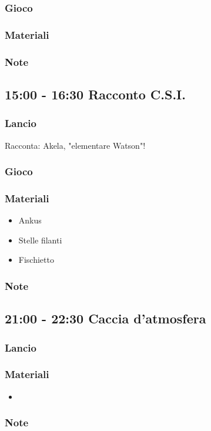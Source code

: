 \documentclass[../main.tex]{subfiles}
\begin{document}
        \subsubsection{Gioco}
        \subsubsection{Materiali}
        \subsubsection{Note}

    \subsection{15:00 - 16:30 Racconto C.S.I.}
       \subsubsection{Lancio}
       Racconta: Akela, "elementare Watson"!
       \subsubsection{Gioco}

    \subsubsection{Materiali}
       \begin{itemize}
            \item Ankus
            \item Stelle filanti
            \item Fischietto
       \end{itemize}
       \subsubsection{Note}

    \subsection{21:00 - 22:30 Caccia d'atmosfera}
        \subsubsection{Lancio}
        \subsubsection{Materiali}
        \begin{itemize}
            \item
        \end{itemize}
        \subsubsection{Note}
   
\end{document}
